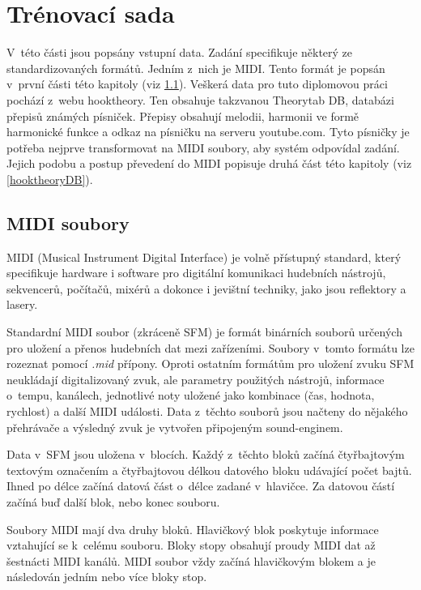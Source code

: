 \chapter{Trénovací sada}
V~této části jsou popsány vstupní data.
Zadání specifikuje některý ze standardizovaných formátů.
Jedním z~nich je MIDI.
Tento formát je popsán v~první části této kapitoly (viz \ref{midisoubory}).
Veškerá data pro tuto diplomovou práci pochází z~webu hooktheory.
Ten obsahuje takzvanou Theorytab DB, databázi přepisů známých písniček.
Přepisy obsahují melodii, harmonii ve formě harmonické funkce 
a odkaz na písničku na serveru youtube.com.
Tyto písničky je potřeba nejprve transformovat na MIDI soubory,
aby systém odpovídal zadání.
Jejich podobu a postup převedení do MIDI popisuje druhá část této kapitoly (viz \ref{hooktheoryDB}).

\section{MIDI soubory}
\label{midisoubory}
MIDI (Musical Instrument Digital Interface) je volně přístupný standard,
který specifikuje hardware i software 
pro digitální komunikaci hudebních nástrojů,
sekvencerů, počítačů, mixérů 
a dokonce i jevištní techniky, jako jsou reflektory a lasery.
\cite{MIDI_tutorials}
\par

Standardní MIDI soubor (zkráceně SFM) je formát binárních souborů 
určených pro uložení a přenos hudebních dat mezi zařízeními.
Soubory v~tomto formátu lze rozeznat pomocí \emph{.mid} přípony.
Oproti ostatním formátům pro uložení zvuku 
SFM neukládají digitalizovaný zvuk,
ale parametry použitých nástrojů, informace o~tempu, kanálech, 
jednotlivé noty uložené jako kombinace (čas, hodnota, rychlost) 
a další MIDI události.
Data z~těchto souborů jsou načteny do nějakého přehrávače 
a výsledný zvuk je vytvořen připojeným sound-enginem.
\cite{MIDI_tutorials,Glatt_aboutMIDIFiles}
\par

Data v~SFM jsou uložena v~blocích.
Každý z~těchto bloků začíná čtyřbajtovým textovým označením 
a čtyřbajtovou délkou datového bloku udávající počet bajtů.
Ihned po délce začíná datová část o~délce zadané v~hlavičce.
Za datovou částí začíná buď další blok, nebo konec souboru.
\cite{MIDI_tutorials,Back_SMF_Specif}
\par

Soubory MIDI mají dva druhy bloků. 
Hlavičkový blok poskytuje informace vztahující se k~celému souboru.
Bloky stopy obsahují proudy MIDI dat až šestnácti MIDI kanálů.
MIDI soubor vždy začíná hlavičkovým blokem 
a je následován jedním nebo více bloky stop.\cite{Back_SMF_Specif}

